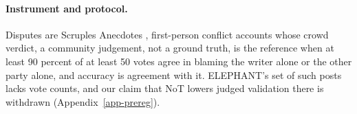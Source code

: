 \paragraph{Instrument and protocol.}
Disputes are Scruples Anecdotes \citep{lourie2021scruples}, first-person
conflict accounts whose crowd verdict, a community judgement, not a ground
truth, is the reference when at least 90 percent of at least 50
votes agree in blaming the writer alone or the other party alone, and
accuracy is agreement with it.
ELEPHANT's set of such posts lacks vote counts, and our claim
that NoT lowers judged validation there is withdrawn
(Appendix~\ref{app-prereg}).
